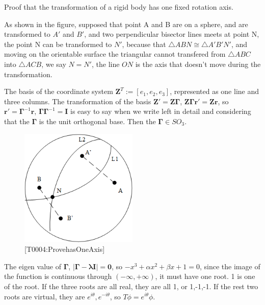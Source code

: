 \begin{proposition}

Proof that the transformation of a rigid body has one fixed rotation axis. 

As shown in the figure, supposed that point A and B are on a sphere, and are transformed to $A'$ and $B'$, and two perpendicular bisector lines meets at point N, the point N can be transformed to $N'$, because that $\bigtriangleup ABN \cong  \bigtriangleup A'B'N'$, and moving on the orientable surface the triangular cannot transfered from $\bigtriangleup ABC$ into $\bigtriangleup ACB$, we say $N = N'$, the line $ON$ is the axis that doesn't move during the transformation.
    
The basis of the coordinate system $\boldsymbol{Z}^T := [e_1,e_2,e_3]$, represented as one line and three columns. The transformation of the basis $\boldsymbol{Z}' = \boldsymbol Z \boldsymbol{\Gamma }$, $\boldsymbol Z \boldsymbol{\Gamma } \boldsymbol{r}' =\boldsymbol Z \boldsymbol r $, so $ \boldsymbol{r}' = \boldsymbol{\Gamma } ^{-1}\boldsymbol{r}$, $\boldsymbol{\Gamma } \boldsymbol{\Gamma } ^{-1} = \boldsymbol{I}$ is easy to say when we write left in detail and considering that the $\boldsymbol{\Gamma }$ is the unit orthogonal base. Then the $\boldsymbol{\Gamma } \in SO_3$.
\end{proposition}

\begin{figure}[h]
    \centering
    \includegraphics[width=0.5\textwidth]{../../resources/T0004_20211212_ProvehasOneAxis.png}
    \caption{[T0004:ProvehasOneAxis]}
\end{figure}

The eigen value of $\boldsymbol{\Gamma }$, $\left\lvert \boldsymbol{\Gamma }-\boldsymbol{\lambda I}\right\rvert = \boldsymbol{0}$, so $-x^3 +\alpha x^2 +\beta x +1 = 0$, since the image of the function is continuous through $(-\infty , + \infty )$, it must have one root. 1 is one of the root. If the three roots are all real, they are all 1, or 1,-1,-1. If the rest two roots are virtual, they are $e^{i\theta},e^{-i\theta}$, so $T \phi = e^{i\theta} \phi $. 



